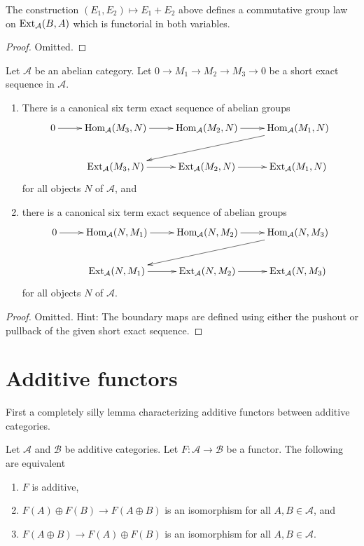 \begin{lemma}
\label{lemma-baer-sum}
The construction $(E_1, E_2) \mapsto E_1 + E_2$
above defines a commutative group
law on $\mathop{\mathrm{Ext}}\nolimits_\mathcal{A}(B, A)$ which is
functorial in both variables.
\end{lemma}

\begin{proof}
Omitted.
\end{proof}

\begin{lemma}
\label{lemma-six-term-sequence-ext}
Let $\mathcal{A}$ be an abelian category.
Let $0 \to M_1 \to M_2 \to M_3 \to 0$ be a short exact sequence
in $\mathcal{A}$.
\begin{enumerate}
\item There is a canonical six term exact sequence of abelian groups
$$
\xymatrix{
0 \ar[r] &
\Hom_\mathcal{A}(M_3, N) \ar[r] &
\Hom_\mathcal{A}(M_2, N) \ar[r] &
\Hom_\mathcal{A}(M_1, N) \ar[lld] \\
& \Ext_\mathcal{A}(M_3, N) \ar[r] &
\Ext_\mathcal{A}(M_2, N) \ar[r] &
\Ext_\mathcal{A}(M_1, N)
}
$$
for all objects $N$ of $\mathcal{A}$, and
\item there is a canonical six term exact sequence of abelian groups
$$
\xymatrix{
0 \ar[r] &
\Hom_\mathcal{A}(N, M_1) \ar[r] &
\Hom_\mathcal{A}(N, M_2) \ar[r] &
\Hom_\mathcal{A}(N, M_3) \ar[lld] \\
& \Ext_\mathcal{A}(N, M_1) \ar[r] &
\Ext_\mathcal{A}(N, M_2) \ar[r] &
\Ext_\mathcal{A}(N, M_3)
}
$$
for all objects $N$ of $\mathcal{A}$.
\end{enumerate}
\end{lemma}

\begin{proof}
Omitted. Hint: The boundary maps are defined using either the pushout
or pullback of the given short exact sequence.
\end{proof}






\section{Additive functors}
\label{section-functors}

\noindent
First a completely silly lemma characterizing additive functors
between additive categories.

\begin{lemma}
\label{lemma-additive-functor}
Let $\mathcal{A}$ and $\mathcal{B}$ be additive categories.
Let $F : \mathcal{A} \to \mathcal{B}$ be a functor.
The following are equivalent
\begin{enumerate}
\item $F$ is additive,
\item $F(A) \oplus F(B) \to F(A \oplus B)$ is an isomorphism for
all $A, B \in \mathcal{A}$, and
\item $F(A \oplus B) \to F(A) \oplus F(B)$  is an isomorphism for
all $A, B \in \mathcal{A}$.
\end{enumerate}
\end{lemma}

